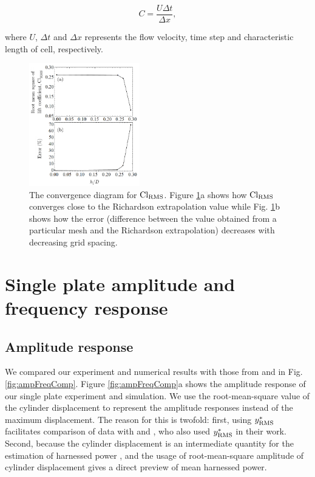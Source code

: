 \documentclass[a4paper,fleqn]{cas-sc}
\begin{document}
\begin{equation}
  C = \frac{U \Delta t}{\Delta x},
  \label{eq:cflNo}
\end{equation}

\noindent where $U$, $\Delta t$ and $\Delta x$ represents the flow velocity, time step and characteristic length of cell, respectively.
\color{black}

\begin{figure}
  \centering
  \includegraphics[width=0.43\textwidth]{figs/figure9}
  \caption{The convergence diagram for $\text{Cl}_{\text{RMS}}$. Figure \ref{fig:clrmsGCI}a shows how $\text{Cl}_{\text{RMS}}$ converges close to the Richardson extrapolation value while Fig. \ref{fig:clrmsGCI}b shows how the error (difference between the value obtained from a particular mesh and the Richardson extrapolation) decreases with decreasing grid spacing.} \label{fig:clrmsGCI}
\end{figure}

\section{Single plate amplitude and frequency response} \label{sec:singPlateResp}
\subsection{Amplitude response} \label{ssec:ampResp}
We compared our experiment and numerical results with those from \citet{Koide2013} and \citet{Nguyen2012} in Fig. \ref{fig:ampFreqComp}. Figure \ref{fig:ampFreqComp}a shows the amplitude response of our single plate experiment and simulation. We use the root-mean-square value of the cylinder displacement to represent the amplitude responses instead of the maximum displacement. The reason for this is twofold: first, using  $y^{*}_{\text{RMS}}$  facilitates comparison of data with \citet{Nguyen2012} and \citet{Koide2013}, who also used  $y^{*}_{\text{RMS}}$  in their work. Second, because the cylinder displacement is an intermediate quantity for the estimation of harnessed power \citep{Maruai2017,Maruai2018}, and the usage of root-mean-square amplitude of cylinder displacement gives a direct preview of mean harnessed power.
\end{document}
